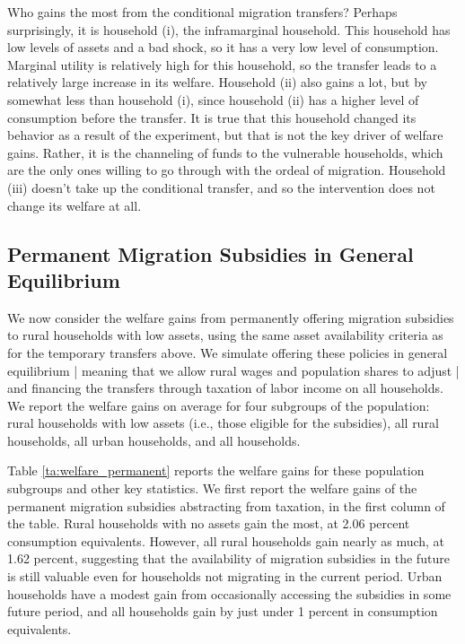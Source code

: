 \documentclass[12pt,pdftex]{article}
\begin{document}
Who gains the most from the conditional migration transfers? Perhaps surprisingly, it is household (i), the inframarginal household. This household has low levels of assets and a bad shock, so it has a very low level of consumption. Marginal utility is relatively high for this household, so the transfer leads to a relatively large increase in its welfare. Household (ii) also gains a lot, but by somewhat less than household (i), since household (ii) has a higher level of consumption before the transfer. It is true that this household changed its behavior as a result of the experiment, but that is not the key driver of welfare gains. Rather, it is the channeling of funds to the vulnerable households, which are the only ones willing to go through with the ordeal of migration. Household (iii) doesn't take up the conditional transfer, and so the intervention does not change its welfare at all.

\subsection{Permanent Migration Subsidies in General Equilibrium}

We now consider the welfare gains from permanently offering migration subsidies to rural households with low assets, using the same asset availability criteria as for the temporary transfers above. We simulate offering these policies in general equilibrium | meaning that we allow rural wages and population shares to adjust | and financing the transfers through taxation of labor income on all households. We report the welfare gains on average for four subgroups of the population: rural households with low assets (i.e., those eligible for the subsidies), all rural households, all urban households, and all households.

Table \ref{ta:welfare_permanent} reports the welfare gains for these population subgroups and other key statistics. We first report the welfare gains of the permanent migration subsidies abstracting from taxation, in the first column of the table. Rural households with no assets gain the most, at 2.06 percent consumption equivalents. However, all rural households gain nearly as much, at 1.62 percent, suggesting that the availability of migration subsidies in the future is still valuable even for households not migrating in the current period. Urban households have a modest gain from occasionally accessing the subsidies in some future period, and all households gain by just under 1 percent in consumption equivalents.
\end{document}
